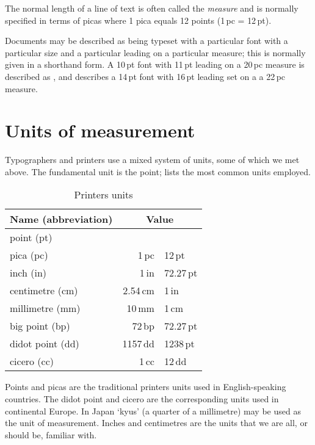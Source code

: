 \documentclass[10pt,letterpaper,extrafontsizes]{memoir}
\newcommand\U[2]{\textrm{#1}\,\textrm{#2}}
\begin{document}
    The normal length of a line of text is often called the 
\emph{measure} and is normally specified in terms of
picas where 1 pica equals 12 points (\U{1}{pc} = \U{12}{pt}).

    Documents may be described as being typeset with a particular font
with a particular size and a particular leading on a particular measure;
this is normally given in a shorthand form. 
A \U{10}{pt} font with \U{11}{pt} leading on a \U{20}{pc} measure is described as
, and  describes a \U{14}{pt} font
with \U{16}{pt} leading set on a a \U{22}{pc} measure.

\section{Units of measurement}

    Typographers and printers use a mixed system of units, some of which
we met above. The fundamental unit is the point;  lists 
the most common units employed.

\begin{table}
\centering
\caption{Printers units} \label{tab:units}
\begin{tabular}{l r @{\,=\,} l   } \toprule
  Name (abbreviation) & \multicolumn{2}{c}{Value}
  \\ 
  \midrule
  point (pt)\index{point}\index{pt}          &   \multicolumn{2}{c}{}         
  \\
  pica (pc)\index{pica}\index{pc}           & \U{1}{pc} & \U{12}{pt} 
  \\
  inch (in)\index{inch}\index{in}           & \U{1}{in} & 72.\U{27}{pt} 
  \\
  centimetre (cm)\index{centimetre}\index{cm}     & 2.\U{54}{cm} & \U{1}{in} 
  \\
  millimetre (mm)\index{millimetre}\index{mm}     & \U{10}{mm} & \U{1}{cm} 
  \\ 
  big point (bp)\index{big point}\index{bp}      & \U{72}{bp} & 72.\U{27}{pt} 
  \\
  didot point (dd)\index{didot point}\index{dd}    & \U{1157}{dd} & \U{1238}{pt} 
  \\
  cicero (cc)\index{cicero}\index{cc}         & \U{1}{cc} & \U{12}{dd} 
  \\
  \bottomrule
\end{tabular}
\end{table}

    Points and picas 
are the traditional printers units used in English-speaking countries. 
The didot point and cicero are the 
corresponding units used in continental Europe. In Japan `kyus'
(a quarter of a millimetre) may be used as the unit of measurement.
Inches and centimetres are the units that we
are all, or should be, familiar with.
\end{document}
